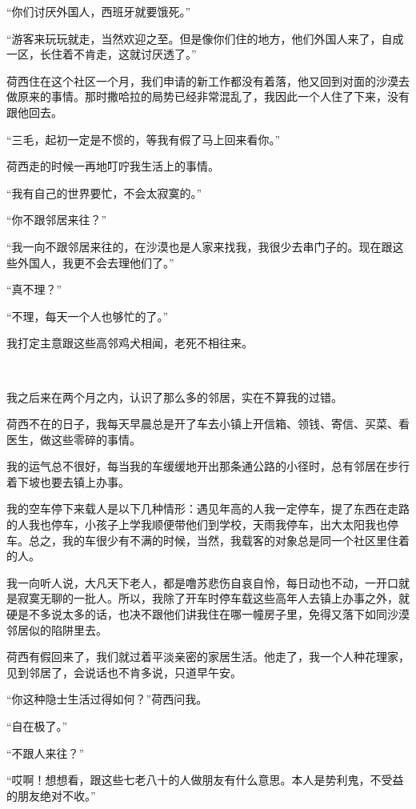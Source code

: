 \par “你们讨厌外国人，西班牙就要饿死。”
\par “游客来玩玩就走，当然欢迎之至。但是像你们住的地方，他们外国人来了，自成一区，长住着不肯走，这就讨厌透了。”
\par 荷西住在这个社区一个月，我们申请的新工作都没有着落，他又回到对面的沙漠去做原来的事情。那时撒哈拉的局势已经非常混乱了，我因此一个人住了下来，没有跟他回去。
\par “三毛，起初一定是不惯的，等我有假了马上回来看你。”
\par 荷西走的时候一再地叮咛我生活上的事情。
\par “我有自己的世界要忙，不会太寂寞的。”
\par “你不跟邻居来往？”
\par “我一向不跟邻居来往的，在沙漠也是人家来找我，我很少去串门子的。现在跟这些外国人，我更不会去理他们了。”
\par “真不理？”
\par “不理，每天一个人也够忙的了。”
\par 我打定主意跟这些高邻鸡犬相闻，老死不相往来。
\par  
\par 我之后来在两个月之内，认识了那么多的邻居，实在不算我的过错。
\par 荷西不在的日子，我每天早晨总是开了车去小镇上开信箱、领钱、寄信、买菜、看医生，做这些零碎的事情。
\par 我的运气总不很好，每当我的车缓缓地开出那条通公路的小径时，总有邻居在步行着下坡也要去镇上办事。
\par 我的空车停下来载人是以下几种情形：遇见年高的人我一定停车，提了东西在走路的人我也停车，小孩子上学我顺便带他们到学校，天雨我停车，出大太阳我也停车。总之，我的车很少有不满的时候，当然，我载客的对象总是同一个社区里住着的人。
\par 我一向听人说，大凡天下老人，都是噜苏悲伤自哀自怜，每日动也不动，一开口就是寂寞无聊的一批人。所以，我除了开车时停车载这些高年人去镇上办事之外，就硬是不多说太多的话，也决不跟他们讲我住在哪一幢房子里，免得又落下如同沙漠邻居似的陷阱里去。
\par 荷西有假回来了，我们就过着平淡亲密的家居生活。他走了，我一个人种花理家，见到邻居了，会说话也不肯多说，只道早午安。
\par “你这种隐士生活过得如何？”荷西问我。
\par “自在极了。”
\par “不跟人来往？”
\par “哎啊！想想看，跟这些七老八十的人做朋友有什么意思。本人是势利鬼，不受益的朋友绝对不收。”
